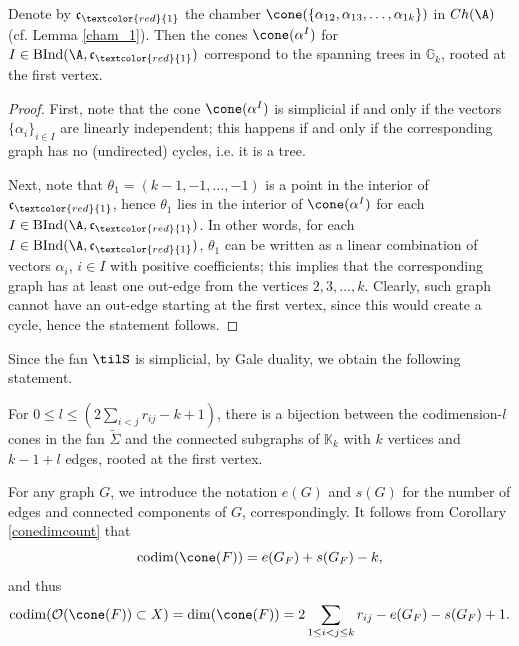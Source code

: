 \begin{lemma}\label{lemma:trees}
Denote by $\mathfrak{c}_{\textcolor{red}{1}}$  the chamber 
$\cone(\{\alpha_{12},\alpha_{13}, \ldots ,\alpha_{1k}\})$ in $ Ch(\A)$ (cf.  Lemma 
\ref{cham_1}). Then the cones $\cone(\alpha^I)$ for $I\in\mathrm{BInd}(\A, 
\mathfrak{c}_{\textcolor{red}{1}})$ correspond to the spanning trees in 
$\mathbb{G}_k$, rooted at the first vertex. 
\end{lemma}
\begin{proof}
First, note that the cone $\cone(\alpha^I)$ is simplicial if and only if the 
vectors $ \{\alpha_i\}_{i\in I} $ are linearly independent; this happens if and 
only if the corresponding  graph has no (undirected) cycles, i.e.  it  is a 
tree. 

Next, note that $\theta_1= (k-1,-1, \ldots ,-1)$ is a point in the interior of $\mathfrak{c}_{\textcolor{red}{1}}$, hence $\theta_1$ lies in the interior of $\cone(\alpha^I)$ for each $I\in\mathrm{BInd}(\A, \mathfrak{c}_{\textcolor{red}{1}})$. In other words, for each $I\in\mathrm{BInd}(\A, \mathfrak{c}_{\textcolor{red}{1}})$,  $\theta_1$ can be written as a linear combination of vectors $\alpha_i$, $i\in I$ with positive coefficients; this implies that the corresponding graph has at least one out-edge from the vertices $2, 3, \ldots , k$. 
Clearly, such graph cannot have an out-edge starting at the first vertex, since this would create a cycle, hence the statement follows. 
\end{proof}


Since the fan $\tilS$ is simplicial, by Gale duality, we obtain the following 
statement. 
\begin{coro}\label{conedimcount}
For $0\leq l  \leq (2\sum_{i<j}r_{ij} - k +1)$, there is a bijection between 
the codimension-$l$ cones in the fan $\widetilde{\Sigma}$ and the connected  
subgraphs of $\mathbb{K}_k$ with $ k $ vertices and $k-1+l$ edges, rooted at 
the first vertex.
\end{coro}	

For any graph $G$, we introduce the notation $e(G)$ and $s(G)$ for the number of edges and connected components of $G$, correspondingly. It follows from Corollary \ref{conedimcount} that 
\begin{equation}\label{codimcone}
\mathrm{codim}(\cone(F)) = e(G_F)+s(G_F)-k,
\end{equation}
and thus
\begin{equation}\label{codimstrata}
\mathrm{codim}(\mathcal{O}(\cone(F))\subset X) =\mathrm{dim}(\cone(F)) =  2\sum_{1\leq i< j\leq k}r_{ij} -e(G_F)-s(G_F)+1.
\end{equation}


